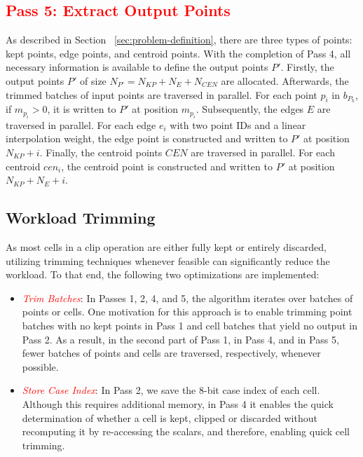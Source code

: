 \documentclass{egpubl}
\newcommand*{\fix}[1]{\textcolor{red}{#1}}
\begin{document}
\subsection{\fix{Pass 5: Extract Output Points}}

As described in Section ~\ref{sec:problem-definition}, there are three types of points: kept points, edge points, and centroid points. With the completion of Pass 4, all necessary information is available to define the output points $P'$. Firstly, the output points $P'$ of size $N_{P'} = N_{KP} + N_E + N_{CEN}$ are allocated. Afterwards, the trimmed batches of input points are traversed in parallel. For each point $p_i$ in $b_{P_k}$, if $m_{p_{i}} > 0$, it is written to $P'$ at position $m_{p_{i}}$. Subsequently, the edges $E$ are traversed in parallel. For each edge $e_i$ with two point IDs and a linear interpolation weight, the edge point is constructed and written to $P'$ at position $N_{KP} + i$. Finally, the centroid points $CEN$ are traversed in parallel. For each centroid $cen_i$, the centroid point is constructed and written to $P'$ at position $N_{KP} + N_E + i$.

\subsection{Workload Trimming}
\label{sec:workload-trimming}

As most cells in a clip operation are either fully kept or entirely discarded, utilizing trimming techniques whenever feasible can significantly reduce the workload. To that end, the following two optimizations are implemented:

\begin{itemize}
    \item \fix{\textit{Trim Batches}}: In Passes 1, 2, 4, and 5, the algorithm iterates over batches of points or cells. One motivation for this approach is to enable trimming point batches with no kept points in Pass 1 and cell batches that yield no output in Pass 2. As a result, in the second part of Pass 1, in Pass 4, and in Pass 5, fewer batches of points and cells are traversed, respectively, whenever possible.
    \item \fix{\textit{Store Case Index}}: In Pass 2, we save the 8-bit case index of each cell. Although this requires additional memory, in Pass 4 it enables the quick determination of whether a cell is kept, clipped or discarded without recomputing it by re-accessing the scalars, and therefore, enabling quick cell trimming.
\end{itemize}
\end{document}
